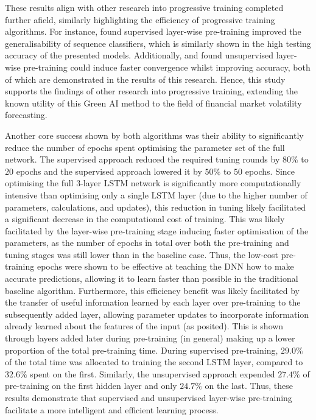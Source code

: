 \documentclass[a4paper, 11pt]{report}
\begin{document}
    These results align with other research into progressive training completed further afield, similarly highlighting the efficiency of progressive training algorithms. For instance, \citet{ienco-2019} found supervised layer-wise pre-training improved the generalisability of sequence classifiers, which is similarly shown in the high testing accuracy of the presented models. Additionally, \citet{xu-2018} and \citet{sagheer-2019} found unsupervised layer-wise pre-training could induce faster convergence whilst improving accuracy, both of which are demonstrated in the results of this research. Hence, this study supports the findings of other research into progressive training, extending the known utility of this Green AI method to the field of financial market volatility forecasting.

    Another core success shown by both algorithms was their ability to significantly reduce the number of epochs spent optimising the parameter set of the full network. The supervised approach reduced the required tuning rounds by $80\%$ to $20$ epochs and the supervised approach lowered it by $50\%$ to $50$ epochs. Since optimising the full 3-layer LSTM network is significantly more computationally intensive than optimising only a single LSTM layer (due to the higher number of parameters, calculations, and updates), this reduction in tuning likely facilitated a significant decrease in the computational cost of training. This was likely facilitated by the layer-wise pre-training stage inducing faster optimisation of the parameters, as the number of epochs in total over both the pre-training and tuning stages was still lower than in the baseline case. Thus, the low-cost pre-training epochs were shown to be effective at teaching the DNN how to make accurate predictions, allowing it to learn faster than possible in the traditional baseline algorithm. Furthermore, this efficiency benefit was likely facilitated by the transfer of useful information learned by each layer over pre-training to the subsequently added layer, allowing parameter updates to incorporate information already learned about the features of the input (as \citet{xu-2021} posited). This is shown through layers added later during pre-training (in general) making up a lower proportion of the total pre-training time. During supervised pre-training, $29.0\%$ of the total time was allocated to training the second LSTM layer, compared to $32.6\%$ spent on the first. Similarly, the unsupervised approach expended $27.4\%$ of pre-training on the first hidden layer and only $24.7\%$ on the last. Thus, these results demonstrate that supervised and unsupervised layer-wise pre-training facilitate a more intelligent and efficient learning process. 
\end{document}
